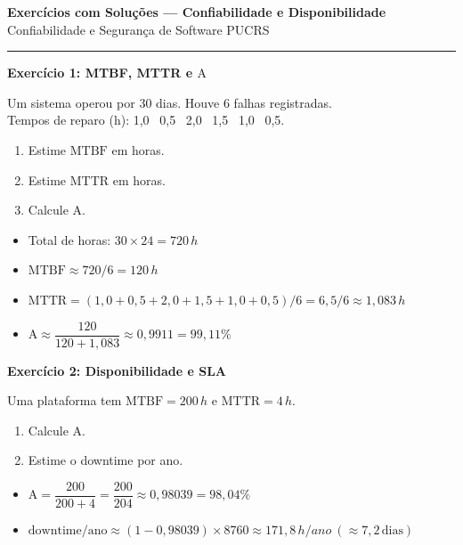 \documentclass[10pt,a4paper]{article}
\newcommand{\A}{\mathrm{A}}
\newcommand{\MTBF}{\mathrm{MTBF}}
\newcommand{\MTTR}{\mathrm{MTTR}}
\begin{document}
\begin{center}
  {\large\bfseries Exercícios com Soluções — Confiabilidade e Disponibilidade}\\[2pt]
  {\small Confiabilidade e Segurança de Software \textbar{} PUCRS}
\end{center}

\vspace{4pt}
\hrule
\vspace{6pt}

\textbf{Exercício 1: MTBF, MTTR e \(\A\)}

Um sistema operou por 30 dias. Houve 6 falhas registradas.\\
Tempos de reparo (h): 1,0 \ 0,5 \ 2,0 \ 1,5 \ 1,0 \ 0,5.
\begin{enumerate}
  \item Estime \(\MTBF\) em horas.
  \item Estime \(\MTTR\) em horas.
  \item Calcule \(\A\).
\end{enumerate}

\begin{solucao}
\begin{itemize}
  \item Total de horas: \(30 \times 24 = 720\,h\)
  \item \(\MTBF \approx 720/6 = 120\,h\)
  \item \(\MTTR = (1{,}0 + 0{,}5 + 2{,}0 + 1{,}5 + 1{,}0 + 0{,}5)/6 = 6{,}5/6 \approx 1{,}083\,h\)
  \item \(\A \approx \dfrac{120}{120 + 1{,}083} \approx 0{,}9911 = 99{,}11\%\)
\end{itemize}
\end{solucao}

\vspace{4pt}

\textbf{Exercício 2: Disponibilidade e SLA}

Uma plataforma tem \(\MTBF=200\,h\) e \(\MTTR=4\,h\).
\begin{enumerate}
  \item Calcule \(\A\).
  \item Estime o downtime por ano.
\end{enumerate}

\begin{solucao}
\begin{itemize}
  \item \(\A = \dfrac{200}{200+4} = \dfrac{200}{204} \approx 0{,}98039 = 98{,}04\%\)
  \item \(\text{downtime/ano} \approx (1 - 0{,}98039) \times 8760 \approx 171{,}8\,h/ano\ (\approx 7{,}2\,\text{dias})\)
\end{itemize}
\end{solucao}
\end{document}
